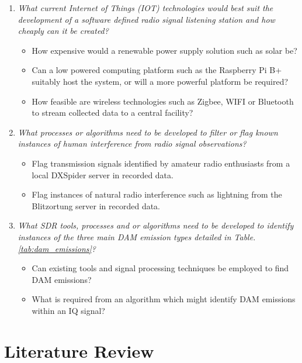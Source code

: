 \begin{enumerate}
  \item \textit{What current Internet of Things (\gls{IOT}) technologies would best suit the development of a software defined radio signal listening station and how cheaply can it be created?}
  \begin{itemize}
  	\item How expensive would a renewable power supply solution such as solar be?
  	\item Can a low powered computing platform such as the Raspberry Pi B+ suitably host the system, or will a more powerful platform be required?
  	\item How feasible are wireless technologies such as Zigbee, WIFI or Bluetooth to stream collected data to a central facility?
  \end{itemize}
  
  \item \textit{What processes or algorithms need to be developed to filter or flag known instances of human interference from radio signal observations?}
  \begin{itemize}
  	\item Flag transmission signals identified by amateur radio enthusiasts from a local DXSpider server in recorded data.
  	\item Flag instances of natural radio interference such as lightning from the Blitzortung server in recorded data.
  \end{itemize}
  
  \item \textit{What \gls{SDR} tools, processes and or algorithms need to be developed to identify instances of the three main \gls{DAM} emission types detailed in Table. \ref{tab:dam_emissions}?}
  \begin{itemize}
  	\item Can existing tools and signal processing techniques be employed to find \gls{DAM} emissions?
  	\item What is required from an algorithm which might identify \gls{DAM} emissions within an \gls{IQ} signal?
  \end{itemize}
  
\end{enumerate}

%
%
\newpage
\section*{Literature Review}

